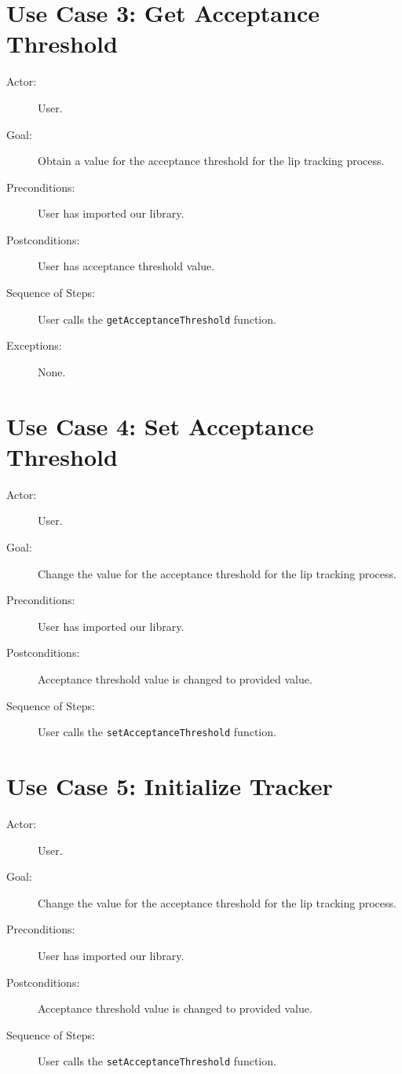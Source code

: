 \section{Use Case 3: Get Acceptance Threshold}

\begin{description}
  \item[Actor:] User.
  \item[Goal:] Obtain a value for the acceptance threshold for the lip tracking process.
  \item[Preconditions:] User has imported our library.
  \item[Postconditions:] User has acceptance threshold value.
  \item[Sequence of Steps:] User calls the \texttt{getAcceptanceThreshold} function.
  \item[Exceptions:] None.
\end{description}


\section{Use Case 4: Set Acceptance Threshold}

\begin{description}
  \item[Actor:] User.
  \item[Goal:] Change the value for the acceptance threshold for the lip tracking process.
  \item[Preconditions:] User has imported our library.
  \item[Postconditions:] Acceptance threshold value is changed to provided value.
  \item[Sequence of Steps:] User calls the \texttt{setAcceptanceThreshold} function.
\end{description}

\section{Use Case 5: Initialize Tracker}

\begin{description}
	\item[Actor:] User.
	\item[Goal:] Change the value for the acceptance threshold for the lip tracking process.
	\item[Preconditions:] User has imported our library.
	\item[Postconditions:] Acceptance threshold value is changed to provided value.
	\item[Sequence of Steps:] User calls the \texttt{setAcceptanceThreshold} function.
\end{description}

